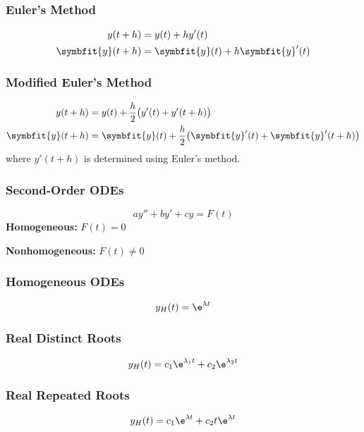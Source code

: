 \documentclass{article}
\begin{document}
\begin{multicols}{3}
    \subsubsection*{Euler's Method}
    \begin{align*}
        y(t+h)           & = y(t) + hy'(t)                     \\
        \symbfit{y}(t+h) & = \symbfit{y}(t) + h\symbfit{y}'(t)
    \end{align*}
    \subsubsection*{Modified Euler's Method}
    \begin{align*}
        y(t+h)           & = y(t) + \frac{h}{2}\bigl( y'(t) + y'(t+h) \bigr)                               \\
        \symbfit{y}(t+h) & = \symbfit{y}(t) + \frac{h}{2}\bigl( \symbfit{y}'(t) + \symbfit{y}'(t+h) \bigr)
    \end{align*}
    where $y'(t+h)$ is determined using Euler's method.
    \subsubsection*{Second-Order ODEs}
    \begin{equation*}
        ay'' + by' + cy = F(t)
    \end{equation*}
    \textbf{Homogeneous:} $F(t) = 0$

    \textbf{Nonhomogeneous:} $F(t) \neq 0$
    \subsubsection*{Homogeneous ODEs}
    \begin{equation*}
        y_H(t) = \e^{\lambda t}
    \end{equation*}
    \subsubsection*{Real Distinct Roots}
    \begin{equation*}
        y_H(t) = c_1\e^{\lambda_1 t} + c_2\e^{\lambda_2 t}
    \end{equation*}
    \subsubsection*{Real Repeated Roots}
    \begin{equation*}
        y_H(t) = c_1\e^{\lambda t} + c_2 t\e^{\lambda t}
    \end{equation*}

\end{multicols}
\end{document}
